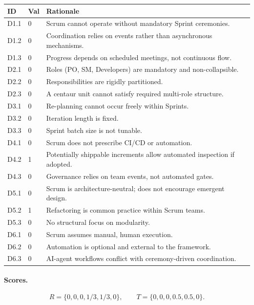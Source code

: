 \documentclass[11pt, a4paper, twocolumn]{article} %
\begin{document}
\begin{table}[h]
\centering
\begin{tabular}{llp{10.5cm}}
\toprule
\textbf{ID} & \textbf{Val} & \textbf{Rationale} \\
\midrule
D1.1 & 0 & Scrum cannot operate without mandatory Sprint ceremonies. \\
D1.2 & 0 & Coordination relies on events rather than asynchronous mechanisms. \\
D1.3 & 0 & Progress depends on scheduled meetings, not continuous flow. \\
\midrule
D2.1 & 0 & Roles (PO, SM, Developers) are mandatory and non-collapsible. \\
D2.2 & 0 & Responsibilities are rigidly partitioned. \\
D2.3 & 0 & A centaur unit cannot satisfy required multi-role structure. \\
\midrule
D3.1 & 0 & Re-planning cannot occur freely within Sprints. \\
D3.2 & 0 & Iteration length is fixed. \\
D3.3 & 0 & Sprint batch size is not tunable. \\
\midrule
D4.1 & 0 & Scrum does not prescribe CI/CD or automation. \\
D4.2 & 1 & Potentially shippable increments allow automated inspection if adopted. \\
D4.3 & 0 & Governance relies on team events, not automated gates. \\
\midrule
D5.1 & 0 & Scrum is architecture-neutral; does not encourage emergent design. \\
D5.2 & 1 & Refactoring is common practice within Scrum teams. \\
D5.3 & 0 & No structural focus on modularity. \\
\midrule
D6.1 & 0 & Scrum assumes manual, human execution. \\
D6.2 & 0 & Automation is optional and external to the framework. \\
D6.3 & 0 & AI-agent workflows conflict with ceremony-driven coordination. \\
\bottomrule
\end{tabular}
\end{table}

\paragraph{Scores.}

\[
R = \{0, 0, 0, 1/3, 1/3, 0\},\qquad
T = \{0, 0, 0, 0.5, 0.5, 0\}.
\]
\end{document}
